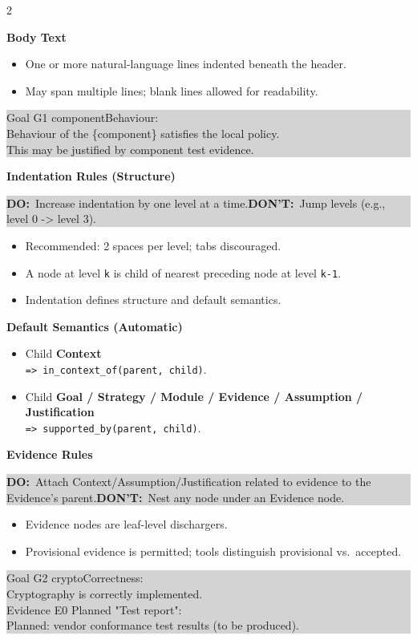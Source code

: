 \documentclass[10pt,letterpaper]{article}
\newcommand{\Sec}[1]{%
  \vspace{5pt}%
  \noindent{\color{RuleGray}\rule{\linewidth}{0.35pt}}\par
  \vspace{2pt}%
  {\bfseries #1}\par
  \vspace{2pt}%
}
\newcommand{\Example}[1]{%
  \vspace{1pt}%
  \noindent\colorbox{LightGray}{%
    \parbox{\linewidth}{\ttfamily\footnotesize\raggedright
#1
    }%
  }%
  \vspace{2pt}%
}
\newcommand{\DoDont}[2]{%
  \vspace{1pt}%
  \noindent\colorbox{LightGray}{%
    \parbox{\linewidth}{\small\textbf{DO:}~#1\hfill \textbf{DON'T:}~#2}%
  }%
  \vspace{2pt}%
}
\begin{document}
\begin{multicols*}{2}
\Sec{Body Text}
\begin{itemize}
  \item One or more natural-language lines indented beneath the header.
  \item May span multiple lines; blank lines allowed for readability.
\end{itemize}
\Example{Goal G1 componentBehaviour:\\
\hspace*{1.5em}Behaviour of the \string\{component\string\} satisfies the local policy.\\
\hspace*{1.5em}This may be justified by component test evidence.}

\columnbreak

\Sec{Indentation Rules (Structure)}
\DoDont{Increase indentation by one level at a time.}{Jump levels (e.g., level 0 -> level 3).}
\begin{itemize}
  \item Recommended: 2 spaces per level; tabs discouraged.
  \item A node at level \texttt{k} is child of nearest preceding node at level \texttt{k-1}.
  \item Indentation defines structure and default semantics.
\end{itemize}
\vspace{-6pt}


\Sec{Default Semantics (Automatic)}
\begin{itemize}
  \item Child \textbf{Context} \\
        \texttt{=> in\_context\_of(parent, child)}.
  \item Child \textbf{Goal / Strategy / Module / Evidence / Assumption / Justification} \\
        \texttt{=> supported\_by(parent, child)}.
\end{itemize}
\vspace{-6pt}


\Sec{Evidence Rules}
\DoDont{Attach Context/Assumption/Justification related to evidence to the Evidence's parent.}{Nest any node under an Evidence node.}
\begin{itemize}
  \item Evidence nodes are leaf-level dischargers.
  \item Provisional evidence is permitted; tools distinguish provisional vs.\ accepted.
\end{itemize}
\Example{Goal G2 cryptoCorrectness:\\
\hspace*{1.5em}Cryptography is correctly implemented.\\
\hspace*{1.5em}Evidence E0 Planned "Test report":\\
\hspace*{3.0em}Planned: vendor conformance test results (to be produced).}


\end{multicols*}
\end{document}

